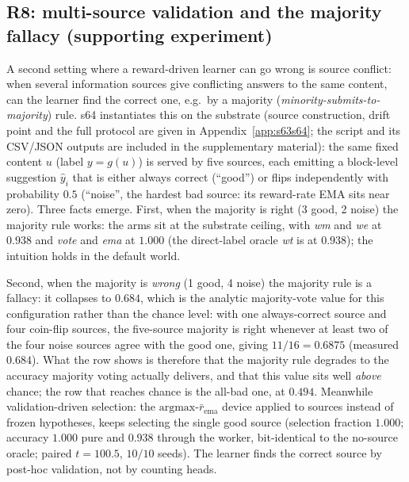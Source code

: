 \documentclass[preprint,12pt]{elsarticle}
\begin{document}
\subsection{R8: multi-source validation and the majority fallacy (supporting experiment)}
\label{sec:r8}

A second setting where a reward-driven learner can go wrong is source
conflict: when several
information sources give conflicting answers to the same content, can the
learner
find the correct one, e.g.\ by a majority (\emph{minority-submits-to-
majority}) rule. s64 instantiates this on the substrate (source construction,
drift point and the full protocol are given in
Appendix~\ref{app:s63s64}; the script and its CSV/JSON outputs are included in
the supplementary material): the same fixed
content $u$ (label $y=g(u)$) is served by five sources, each emitting a
block-level suggestion $\hat y_i$ that is either always correct
(``good'') or flips independently with probability $0.5$ (``noise'', the
hardest bad source: its reward-rate EMA sits near zero). Three facts
emerge. First, when the majority is right (3 good, 2 noise) the majority
rule works: the arms sit at the substrate ceiling, with \textit{wm} and
\textit{we} at $0.938$ and \textit{vote} and \textit{ema} at $1.000$ (the
direct-label oracle \textit{wt} is at $0.938$); the intuition holds in the
default world.

Second, when the
majority is \emph{wrong} (1 good, 4 noise) the majority rule is a fallacy:
it collapses to $0.684$, which is the analytic majority-vote value for this
configuration rather than the chance level: with one always-correct source and
four coin-flip sources, the five-source majority is right whenever at least
two of the four noise sources agree with the good one, giving
$11/16=0.6875$ (measured $0.684$). What the row shows is therefore that the
majority rule degrades to the accuracy majority voting actually delivers, and
that this value sits well \emph{above} chance; the row that reaches chance
is the all-bad one, at $0.494$. Meanwhile validation-driven selection: the
$\mathrm{argmax}$-$\bar r_{\mathrm{ema}}$ device applied to sources instead of
frozen hypotheses, keeps selecting the single good source (selection
fraction $1.000$; accuracy $1.000$ pure and $0.938$ through the worker,
bit-identical to the no-source oracle; paired $t=100.5$, $10/10$ seeds). The
learner finds the correct source by post-hoc validation, not by
counting heads.
\end{document}
